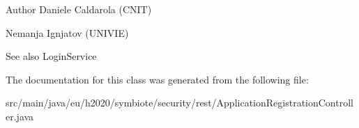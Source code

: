 \begin{DoxyAuthor}{Author}
Daniele Caldarola (C\+N\+IT) 

Nemanja Ignjatov (U\+N\+I\+V\+IE) 
\end{DoxyAuthor}
\begin{DoxySeeAlso}{See also}
Login\+Service 
\end{DoxySeeAlso}


The documentation for this class was generated from the following file\+:\begin{DoxyCompactItemize}
\item 
src/main/java/eu/h2020/symbiote/security/rest/Application\+Registration\+Controller.\+java\end{DoxyCompactItemize}

